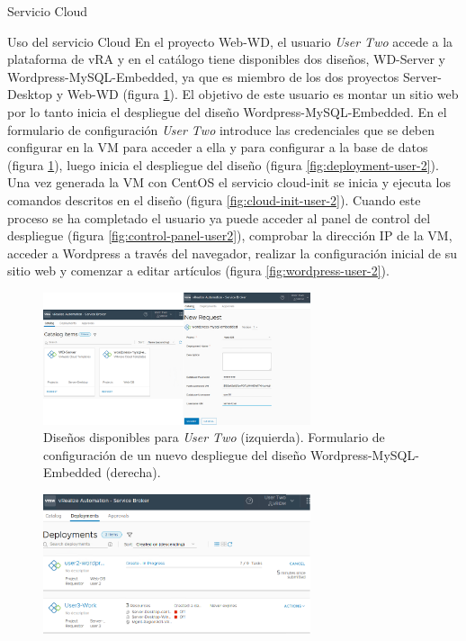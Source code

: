 \begin{subsection}{Servicio Cloud}
\begin{subsubsection}{Uso del servicio Cloud}
        En el proyecto Web-WD, el usuario \textit{User Two} accede a la plataforma de vRA y en el catálogo tiene disponibles dos diseños, WD-Server y Wordpress-MySQL-Embedded, ya que es miembro de los dos proyectos Server-Desktop y Web-WD (figura \ref{fig:catalog-user-2}). El objetivo de este usuario es montar un sitio web por lo tanto inicia el despliegue del diseño Wordpress-MySQL-Embedded. En el formulario de configuración \textit{User Two} introduce las credenciales que se deben configurar en la VM para acceder a ella y para configurar a la base de datos  (figura \ref{fig:catalog-user-2}), luego inicia el despliegue del diseño (figura \ref{fig:deployment-user-2}). Una vez generada la VM con CentOS el servicio cloud-init se inicia y ejecuta los comandos descritos en el diseño (figura \ref{fig:cloud-init-user-2}). Cuando este proceso se ha completado el usuario ya puede acceder al panel de control del despliegue (figura \ref{fig:control-panel-user2}), comprobar la dirección IP de la VM, acceder a Wordpress a través del navegador, realizar la configuración inicial de su sitio web y comenzar a editar artículos (figura \ref{fig:wordpress-user-2}).
        \begin{figure}[h]
            \centering
            \includegraphics[width=0.7\textwidth]{imaxes/pruebaconcepto/vrealize/user-two-catalog.png}
            \caption{Diseños disponibles para \textit{User Two} (izquierda). Formulario de configuración de un nuevo despliegue del diseño Wordpress-MySQL-Embedded (derecha).}
            \label{fig:catalog-user-2}
        \end{figure}
        \FloatBarrier
        \begin{figure}[h]
            \centering
            \includegraphics[width=0.7\textwidth]{imaxes/pruebaconcepto/vrealize/user-2-card-deploy.png}

\end{figure}
\end{subsubsection}
\end{subsection}
